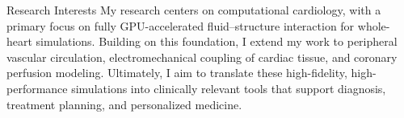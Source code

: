 \begin{rubric}{Research Interests}
\entry*[] My research centers on computational cardiology, with a primary 
focus on fully GPU-accelerated fluid–structure interaction for whole-heart 
simulations. Building on this foundation, I extend my work to peripheral 
vascular circulation, electromechanical coupling of cardiac tissue, and 
coronary perfusion modeling. Ultimately, I aim to translate these high-fidelity, 
high-performance simulations into clinically relevant tools that support 
diagnosis, treatment planning, and personalized medicine.
\end{rubric}